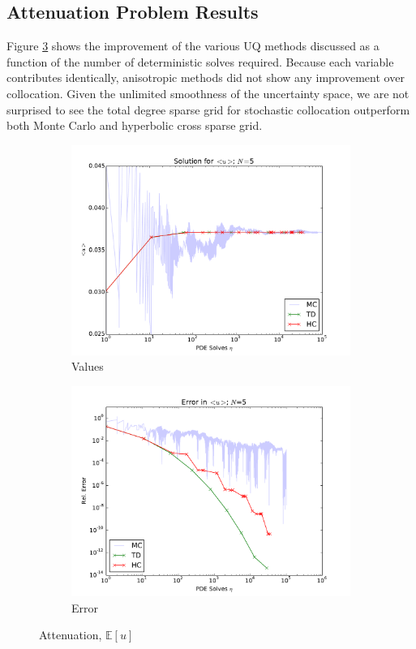 \documentclass{mc2015}
\newcommand{\expv}[1]{\ensuremath{\mathbb{E}[ #1]}}
\begin{document}
\subsection{Attenuation Problem Results}
Figure \ref{attn} shows the improvement of the various UQ methods discussed as a function of the number of deterministic solves required.  Because each variable contributes identically, anisotropic methods did not show any improvement over collocation.  Given the unlimited smoothness of the uncertainty space, we are not surprised to see the total degree sparse grid for stochastic collocation outperform both Monte Carlo and hyperbolic cross sparse grid.
\begin{figure}[htb]
\centering
  \begin{subfigure}[b]{0.49 \textwidth}
   \includegraphics[width=\textwidth]{../graphics/attenuate_N5_soln}
   \caption{Values}
   \label{atn vals}
  \end{subfigure}
  \begin{subfigure}[b]{0.49 \textwidth}
   \includegraphics[width=\textwidth]{../graphics/attenuate_N5_conv}
   \caption{Error}
   \label{atn errs}
  \end{subfigure}
  \caption{Attenuation, \expv{u}}
  \label{attn}
\end{figure}
\end{document}
